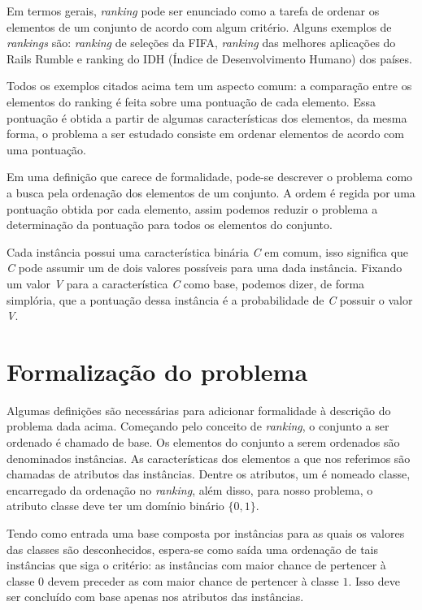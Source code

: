 Em termos gerais, \emph{ranking} pode ser enunciado como a tarefa de
ordenar os elementos de um conjunto de acordo com algum critério. Alguns
exemplos de \emph{rankings} são: \emph{ranking} de seleções da FIFA,
\emph{ranking} das melhores aplicações do Rails Rumble e ranking do IDH
(Índice de Desenvolvimento Humano) dos países.

Todos os exemplos citados acima tem um aspecto comum: a comparação entre os
elementos do ranking é feita sobre uma pontuação de cada elemento. Essa
pontuação é obtida a partir de algumas características dos elementos, da mesma
forma, o problema a ser estudado consiste em ordenar elementos de acordo com
uma pontuação.

Em uma definição que carece de formalidade, pode-se descrever o problema como
a busca pela ordenação dos elementos de um conjunto. A ordem é regida por uma
pontuação obtida por cada elemento, assim podemos reduzir o problema a
determinação da pontuação para todos os elementos do conjunto.

Cada instância possui uma característica binária \emph{C} em comum, isso
significa que \emph{C} pode assumir um de dois valores possíveis para uma dada
instância. Fixando um valor \emph{V} para a característica \emph{C} como base,
podemos dizer, de forma simplória, que a pontuação dessa instância é a
probabilidade de \emph{C} possuir o valor \emph{V}.

\section{Formalização do problema}
Algumas definições são necessárias para adicionar formalidade à descrição do
problema dada acima. Começando pelo conceito de \emph{ranking}, o conjunto a
ser ordenado é chamado de base. Os elementos do conjunto a serem ordenados são
denominados instâncias. As características dos elementos a que nos referimos
são chamadas de atributos das instâncias. Dentre os atributos, um é nomeado
classe, encarregado da ordenação no \emph{ranking}, além disso, para nosso
problema, o atributo classe deve ter um domínio binário $\{0, 1\}$.

Tendo como entrada uma base composta por instâncias para as quais os valores
das classes são desconhecidos, espera-se como saída uma ordenação de tais
instâncias que siga o critério: as instâncias com maior chance de pertencer à
classe $0$ devem preceder as com maior chance de pertencer à classe $1$. Isso
deve ser concluído com base apenas nos atributos das instâncias.

